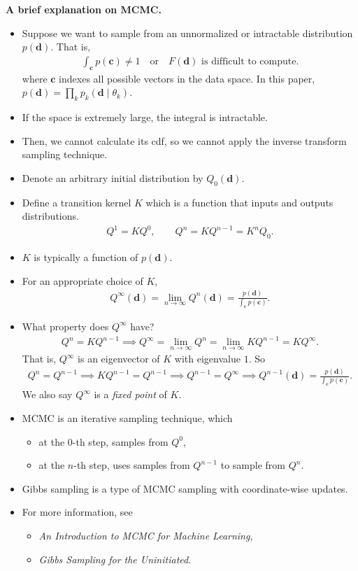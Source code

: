 \documentclass[10pt]{article}
\begin{document}
\textbf{A brief explanation on MCMC.}
\begin{itemize}
\item Suppose we want to sample from an unnormalized or intractable distribution $p(\mathbf{d})$. That is,
\begin{align*}
\int_\mathbf{c} p(\mathbf{c}) \neq 1 \quad \text{or} \quad F(\mathbf{d}) \text{ is difficult to compute}.
\end{align*}
where $\mathbf{c}$ indexes all possible vectors in the data space. In this paper, $p(\mathbf{d}) = \prod_k p_k(\mathbf{d} \mid \theta_k)$.
\item If the space is extremely large, the integral is intractable.
\item Then, we cannot calculate its cdf, so we cannot apply the inverse transform sampling technique.
\item Denote an arbitrary initial distribution by $Q_0(\mathbf{d})$.
\item Define a transition kernel $K$ which is a function that inputs and outputs distributions.
\begin{align*}
Q^1 = K Q^0, \qquad Q^n = K Q^{n - 1} =  K^n Q_0.
\end{align*}
\item $K$ is typically a function of $p(\mathbf{d})$.
\item For an appropriate choice of $K$,
\begin{align*}
Q^\infty(\mathbf{d}) = \lim_{n \rightarrow \infty} Q^n(\mathbf{d}) = \frac{p(\mathbf{d})}{\int_\mathbf{c} p(\mathbf{c})}.
\end{align*}
\item What property does $Q^\infty$ have?
\begin{align*}
Q^n = KQ^{n - 1} \implies Q^\infty = \lim_{n \rightarrow \infty} Q^n = \lim_{n \rightarrow \infty} KQ^{n - 1} = KQ^\infty.
\end{align*}
That is, $Q^\infty$ is an eigenvector of $K$ with eigenvalue $1$. So
\begin{align*}
Q^n = Q^{n - 1} \implies KQ^{n - 1} = Q^{n - 1} \implies Q^{n - 1} = Q^\infty \implies Q^{n - 1}(\mathbf{d}) = \frac{p(\mathbf{d})}{\int_\mathbf{c} p(\mathbf{c})}.
\end{align*}
We also say $Q^\infty$ is a \textit{fixed point} of $K$.
\item MCMC is an iterative sampling technique, which
\begin{itemize}
\item at the $0$-th step, samples from $Q^0$,
\item at the $n$-th step, uses samples from $Q^{n - 1}$ to sample from $Q^n$.
\end{itemize}
\item Gibbs sampling is a type of MCMC sampling with coordinate-wise updates.
\item For more information, see
\begin{itemize}
\item \textit{An Introduction to MCMC for Machine Learning},
\item \textit{Gibbs Sampling for the Uninitiated}.
\end{itemize}
\end{itemize}
\end{document}
